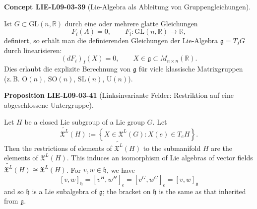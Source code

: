 \documentclass[10pt, letterpaper]{article}
\newcommand{\CustomHeading}[3]{%
  \par\medskip\noindent%
  \textbf{#1 #2} \textnormal{(#3)}.\enskip%
}
\newenvironment{PROP}[2]{\CustomHeading{Proposition}{#1}{#2}}{}
\newenvironment{CONC}[2]{\CustomHeading{Concept}{#1}{#2}}{}
\begin{document}
\begin{CONC}{LIE-L09-03-39}{Lie-Algebra als Ableitung von Gruppengleichungen}
Ist $G\subset \mathrm{GL}(n,\mathbb{R})$ durch eine oder mehrere glatte Gleichungen
\[
F_i(A)=0,\qquad F_i:\mathrm{GL}(n,\mathbb{R})\to \mathbb R,
\]
definiert, so erhält man die definierenden Gleichungen der Lie‐Algebra
$\mathfrak g=T_I G$ durch linearisieren:
\[
(dF_i)_I(X)=0,\qquad X\in \mathfrak g\subset M_{n\times n}(\mathbb{R}).
\]
Dies erlaubt die explizite Berechnung von $\mathfrak g$ für viele klassische Matrixgruppen
(z.\,B. $\mathrm{O}(n)$, $\mathrm{SO}(n)$, $\mathrm{SL}(n)$, $\mathrm{U}(n)$).
\end{CONC}

\begin{PROP}{LIE-L09-03-41}{Linksinvariante Felder: Restriktion auf eine abgeschlossene Untergruppe}
Let $H$ be a closed Lie subgroup of a Lie group $G$. Let
$$
\widetilde{\mathfrak{X}^{L}}(H):=\left\{X \in \mathfrak{X}^{L}(G): X(e) \in T_{e} H\right\} .
$$
Then the restrictions of elements of $\widetilde{\mathfrak{X}^{L}}(H)$ to the submanifold $H$ are the elements of $\mathfrak{X}^{L}(H)$. This induces an isomorphism of Lie algebras of vector fields $\widetilde{\mathfrak{X}^{L}}(H) \cong \mathfrak{X}^{L}(H)$. For $v, w \in \mathfrak{h}$, we have
$$
[v, w]_{\mathfrak{h}}=\left[v^{H}, w^{H}\right]_{e}=\left[v^{G}, w^{G}\right]_{e}=[v, w]_{\mathfrak{g}}
$$
and so $\mathfrak{h}$ is a Lie subalgebra of $\mathfrak{g}$; the bracket on $\mathfrak{h}$ is the same as that inherited from $\mathfrak{g}$.
\end{PROP}
\end{document}
